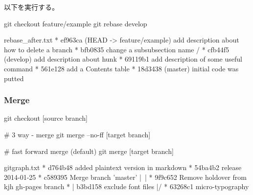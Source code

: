 \documentclass[10pt,a4j,openany,dvipdfmx]{jsarticle}
\begin{document}
以下を実行する。
\begin{commandshell}
git checkout feature/example
git rebase develop 
\end{commandshell}


\begin{filecontents}{rebase_after.txt}
  * ef963ca (HEAD -> feature/example) add description about how to delete a branch
  * bfb0835 change a subsubsection name
 /  
* cfb44f5 (develop) add description about hunk
* 69119b1 add description of some useful command
* 561e128 add a Contents table
* 18d3438 (master) initial code was putted
\end{filecontents}



\subsubsection{Merge} %
\label{ssub:merge}

\begin{commandshell}
git checkout [source branch]

# 3 way - merge
git merge --no-ff [target branch]

# fast forward merge (default)
git merge [target branch]
\end{commandshell}


\begin{filecontents}{gitgraph.txt}
* d764b48 added plaintext version in markdown
* 54ba4b2 release 2014-01-25
*   c589395 Merge branch 'master'
|\
| * 9f9c652 Remove holdover from kjh gh-pages branch
* | b3bd158 exclude font files
|/
* 63268c1 micro-typography
\end{filecontents}
\end{document}
